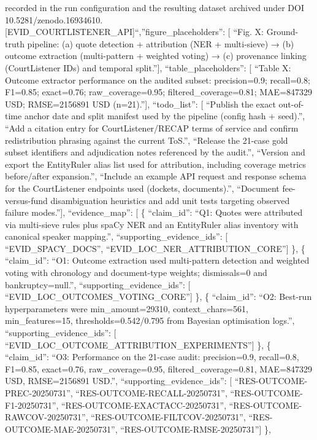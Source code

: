 recorded in the run configuration and the resulting dataset archived under DOI 10.5281/zenodo.16934610. {[}EVID\_COURTLISTENER\_API{]}\n``,''figure\_placeholders'': {[}
``Fig. X: Ground-truth pipeline: (a) quote detection + attribution (NER + multi-sieve) → (b) outcome extraction (multi-pattern + weighted voting) → (c) provenance linking (CourtListener IDs) and temporal split.''{]},
``table\_placeholders'': {[}
``Table X: Outcome extractor performance on the audited subset: precision=0.9; recall=0.8; F1=0.85; exact=0.76; raw\_coverage=0.95; filtered\_coverage=0.81; MAE=847329 USD; RMSE=2156891 USD (n=21).''{]},
``todo\_list'': {[}
``Publish the exact out-of-time anchor date and split manifest used by the pipeline (config hash + seed).'',
``Add a citation entry for CourtListener/RECAP terms of service and confirm redistribution phrasing against the current ToS.'',
``Release the 21-case gold subset identifiers and adjudication notes referenced by the audit.'',
``Version and export the EntityRuler alias list used for attribution, including coverage metrics before/after expansion.'',
``Include an example API request and response schema for the CourtListener endpoints used (dockets, documents).'',
``Document fee-versus-fund disambiguation heuristics and add unit tests targeting observed failure modes.''{]},
``evidence\_map'': {[}
\{
``claim\_id'': ``Q1: Quotes were attributed via multi-sieve rules plus spaCy NER and an EntityRuler alias inventory with canonical speaker mapping.'',
``supporting\_evidence\_ids'': {[}
``EVID\_SPACY\_DOCS'',
``EVID\_LOC\_NER\_ATTRIBUTION\_CORE''{]}
\},
\{
``claim\_id'': ``O1: Outcome extraction used multi-pattern detection and weighted voting with chronology and document-type weights; dismissals=0 and bankruptcy=null.'',
``supporting\_evidence\_ids'': {[}
``EVID\_LOC\_OUTCOMES\_VOTING\_CORE''{]}
\},
\{
``claim\_id'': ``O2: Best-run hyperparameters were min\_amount=29310, context\_chars=561, min\_features=15, thresholds=0.542/0.795 from Bayesian optimisation logs.'',
``supporting\_evidence\_ids'': {[}
``EVID\_LOC\_OUTCOME\_ATTRIBUTION\_EXPERIMENTS''{]}
\},
\{
``claim\_id'': ``O3: Performance on the 21-case audit: precision=0.9, recall=0.8, F1=0.85, exact=0.76, raw\_coverage=0.95, filtered\_coverage=0.81, MAE=847329 USD, RMSE=2156891 USD.'',
``supporting\_evidence\_ids'': {[}
``RES-OUTCOME-PREC-20250731'',
``RES-OUTCOME-RECALL-20250731'',
``RES-OUTCOME-F1-20250731'',
``RES-OUTCOME-EXACTACC-20250731'',
``RES-OUTCOME-RAWCOV-20250731'',
``RES-OUTCOME-FILTCOV-20250731'',
``RES-OUTCOME-MAE-20250731'',
``RES-OUTCOME-RMSE-20250731''{]}
\},
